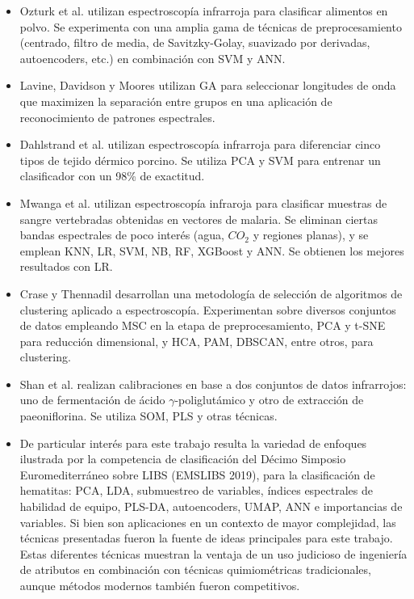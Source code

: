 \documentclass[12pt]{article}
\begin{document}
\begin{itemize}
    \item Ozturk et al. utilizan espectroscopía infrarroja para clasificar alimentos en polvo\cite{F-ENG}. Se experimenta con una amplia gama de técnicas de preprocesamiento (centrado, filtro de media, de Savitzky-Golay, suavizado por derivadas, autoencoders, etc.) en combinación con SVM y ANN.
    \item Lavine, Davidson y Moores utilizan GA para seleccionar longitudes de onda que maximizen la separación entre grupos en una aplicación de reconocimiento de patrones espectrales\cite{GA}. 
    \item Dahlstrand et al. utilizan espectroscopía infrarroja para diferenciar cinco tipos de tejido dérmico porcino\cite{PCA-SVM}. Se utiliza PCA y SVM para entrenar un clasificador con un 98\% de exactitud.
    \item Mwanga et al. utilizan espectroscopía infraroja para clasificar muestras de sangre vertebradas obtenidas en vectores de malaria\cite{MULT}. Se eliminan ciertas bandas espectrales de poco interés (agua, $CO_2$ y regiones planas), y se emplean KNN, LR, SVM, NB, RF, XGBoost y ANN. Se obtienen los mejores resultados con LR.
    \item Crase y Thennadil desarrollan una metodología de selección de algoritmos de clustering aplicado a espectroscopía\cite{CLUST}. Experimentan sobre diversos conjuntos de datos empleando MSC en la etapa de preprocesamiento, PCA y t-SNE para reducción dimensional, y HCA, PAM, DBSCAN, entre otros, para clustering.
    \item Shan et al. realizan calibraciones en base a dos conjuntos de datos infrarrojos: uno de fermentación de ácido $\gamma$-poliglutámico y otro de extracción de paeoniflorina\cite{SOM}. Se utiliza SOM, PLS y otras técnicas.
    \item De particular interés para este trabajo resulta la variedad de enfoques ilustrada por la competencia de clasificación del Décimo Simposio Euromediterráneo sobre LIBS (EMSLIBS 2019), para la clasificación de hematitas\cite{EMSLIBS2019}: PCA, LDA, submuestreo de variables, índices espectrales de habilidad de equipo, PLS-DA, autoencoders, UMAP, ANN e importancias de variables. Si bien son aplicaciones en un contexto de mayor complejidad, las técnicas presentadas fueron la fuente de ideas principales para este trabajo. Estas diferentes técnicas muestran la ventaja de un uso judicioso de ingeniería de atributos en combinación con técnicas quimiométricas tradicionales, aunque métodos modernos también fueron competitivos.
\end{itemize}
\end{document}
